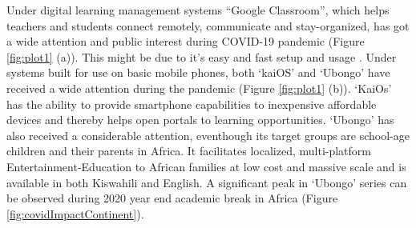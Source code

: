 \documentclass[11pt,a4paper,]{article}
\begin{document}
Under digital learning management systems ``Google Classroom'', which helps teachers and students connect remotely, communicate and stay-organized, has got a wide attention and public interest during COVID-19 pandemic (Figure \ref{fig:plot1} (a)). This might be due to it's easy and fast setup and usage \autocite{sudarsana2019use}. Under systems built for use on basic mobile phones, both `kaiOS' and `Ubongo' have received a wide attention during the pandemic (Figure \ref{fig:plot1} (b)).
`KaiOs' has the ability to provide smartphone capabilities to inexpensive affordable devices and thereby helps open portals to learning opportunities. `Ubongo' has also received a considerable attention, eventhough its target groups are school-age children and their parents in Africa. It facilitates localized, multi-platform Entertainment-Education to African families at low cost and massive scale and is available in both Kiswahili and English. A significant peak in `Ubongo' series can be observed during 2020 year end academic break in Africa (Figure \ref{fig:covidImpactContinent}).
\end{document}

